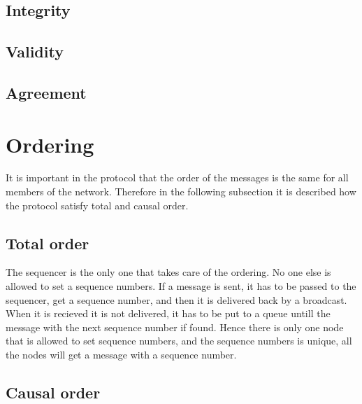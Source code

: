 \documentclass{article}
\begin{document}
\subsection{Integrity}


\subsection{Validity}

\subsection{Agreement}

\section{Ordering}
  It is important in the protocol that the order of the messages is the same 
  for all members of the network. Therefore in the following subsection it is 
  described how the protocol satisfy total and causal order.

\subsection{Total order}
  The sequencer is the only one that takes care of the ordering. 
  No one else is allowed to set a sequence numbers. If a message 
  is sent, it has to be passed to the sequencer, get a sequence 
  number, and then it is delivered back by a broadcast. When it 
  is recieved it is not delivered, it has to be put to a queue 
  untill the message with the next sequence number if found. 
  Hence there is only one node that is allowed to set sequence 
  numbers, and the  sequence numbers is unique, all the nodes 
  will get a message with a sequence number.
  
\subsection{Causal order}
\end{document}

